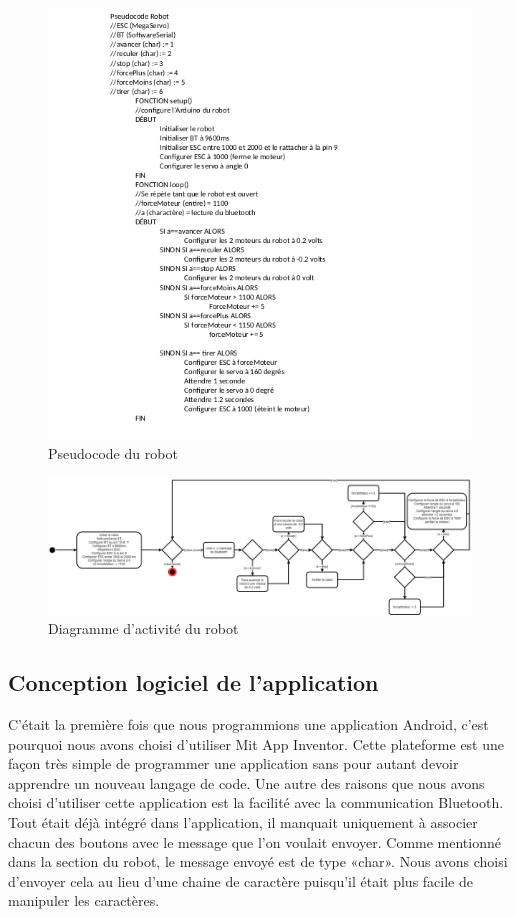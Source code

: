 \begin{figure}[h!]
    \centering
    \includegraphics[width=\linewidth]{img/s2/code/pseudo-robot}
    \caption{Pseudocode du robot}
    \label{fig:s2-code-pseudo-robot}
\end{figure}

\clearpage

\begin{figure}[h!]
    \centering
    \includegraphics[width=\linewidth]{img/s2/code/UML-robot}
    \caption{Diagramme d'activité du robot}
    \label{fig:s2-code-UML-robot}
\end{figure}

\subsection{Conception logiciel de l'application}

C’était la première fois que nous programmions une application Android, c’est pourquoi nous avons choisi d’utiliser Mit App Inventor.
Cette plateforme est une façon très simple de programmer une application sans pour autant devoir apprendre un nouveau langage de code.
Une autre des raisons que nous avons choisi d’utiliser cette application est la facilité avec la communication Bluetooth.
Tout était déjà intégré dans l’application, il manquait uniquement à associer chacun des boutons avec le message que l’on voulait envoyer.
Comme mentionné dans la section du robot, le message envoyé est de type «char».
Nous avons choisi d’envoyer cela au lieu d’une chaine de caractère puisqu’il était plus facile de manipuler les caractères.

